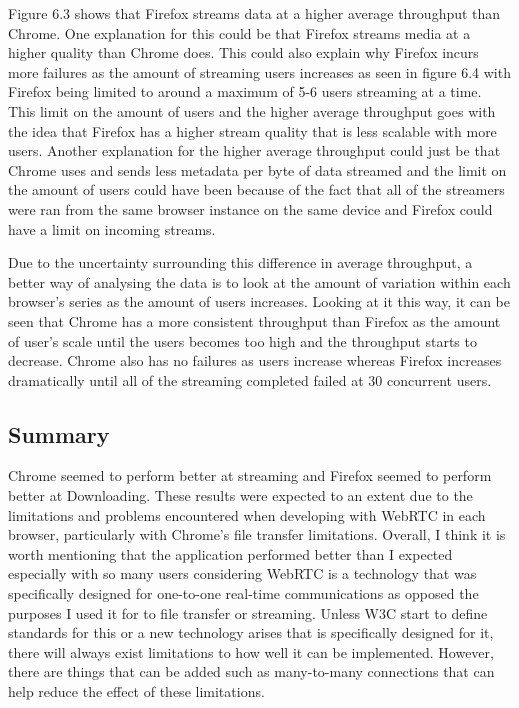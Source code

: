 \documentclass[]{report}
\begin{document}
		Figure 6.3 shows that Firefox streams data at a higher average throughput than Chrome. One explanation for this could be that Firefox streams media at a higher quality than Chrome does. This could also explain why Firefox incurs more failures as the amount of streaming users increases as seen in figure 6.4 with Firefox being limited to around a maximum of 5-6 users streaming at a time. This limit on the amount of users and the higher average throughput goes with the idea that Firefox has a higher stream quality that is less scalable with more users. 
	 	Another explanation for the higher average throughput could just be that Chrome uses and sends less metadata per byte of data streamed and the limit on the amount of users could have been because of the fact that all of the streamers were ran from the same browser instance on the same device and Firefox could have a limit on incoming streams.
	 	
		Due to the uncertainty surrounding this difference in average throughput, a better way of analysing the data is to look at the amount of variation within each browser's series as the amount of users increases. Looking at it this way, it can be seen that Chrome has a more consistent throughput than Firefox as the amount of user's scale until the users becomes too high and the throughput starts to decrease. Chrome also has no failures as users increase whereas Firefox increases dramatically until all of the streaming completed failed at 30 concurrent users.
		
		\subsection{Summary}
		Chrome seemed to perform better at streaming and Firefox seemed to perform better at Downloading. These results were expected to an extent due to the limitations and problems encountered when developing with WebRTC in each browser, particularly with Chrome's file transfer limitations. Overall, I think it is worth mentioning that the application performed better than I expected especially with so many users considering WebRTC is a technology that was specifically designed for one-to-one real-time communications as opposed the purposes I used it for to file transfer or streaming. Unless W3C start to define standards for this or a new technology arises that is specifically designed for it, there will always exist limitations to how well it can be implemented. However, there are things that can be added such as many-to-many connections that can help reduce the effect of these limitations.
		
\end{document}
